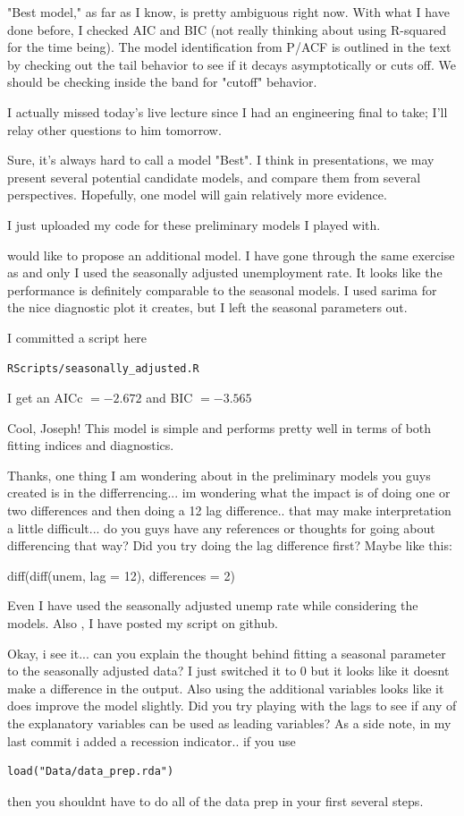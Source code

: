 \documentclass[twoside,twocolumn]{article}
\begin{document}
"Best model," as far as I know, is pretty ambiguous right now. With what I have done before, I checked AIC and BIC (not really thinking about using R-squared for the time being). The model identification from P/ACF is outlined in the text by checking out the tail behavior to see if it decays asymptotically or cuts off. We should be checking inside the band for "cutoff" behavior.

I actually missed today's live lecture since I had an engineering final to take; I'll relay other questions to him tomorrow.


Sure, it's always hard to call a model "Best". I think in presentations, we
may present several potential candidate models, and compare them from
several perspectives. Hopefully, one model will gain relatively more
evidence.

I just uploaded my code for these preliminary models I played with.


 would like to propose an additional model. I have gone through the same exercise as  and \@bopangpsy only I used the seasonally adjusted unemployment rate. It looks like the performance is definitely comparable to the seasonal models. I used sarima for the nice diagnostic plot it creates, but I left the seasonal parameters out.

I committed a script here \begin{verbatim}RScripts/seasonally_adjusted.R\end{verbatim}

I get an AICc \(= -2.672\) and BIC \(= -3.565\)

Cool, Joseph! This model is simple and performs pretty well in terms of
both fitting indices and diagnostics.



Thanks, one thing I am wondering about in the preliminary models you guys created is in the differrencing... im wondering what the impact is of doing one or two differences and then doing a 12 lag difference.. that may make interpretation a little difficult... do you guys have any references or thoughts for going about differencing that way? Did you try doing the lag difference first? Maybe like this:

diff(diff(unem, lag = 12), differences = 2)

Even I have used the seasonally adjusted unemp rate while considering the
models. Also , I have posted my script on github.

Okay, i see it... can you explain the thought behind fitting a seasonal parameter to the seasonally adjusted data? I just switched it to 0 but it looks like it doesnt make a difference in the output. Also using the additional variables looks like it does improve the model slightly. Did you try playing with the lags to see if any of the explanatory variables can be used as leading variables? As a side note, in my last commit i added a recession indicator.. if you use \begin{verbatim}load("Data/data_prep.rda")\end{verbatim} then you shouldnt have to do all of the data prep in your first several steps.
\end{document}
